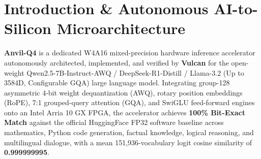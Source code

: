 \documentclass[11pt,a4paper]{article}
\begin{document}
\section{Introduction \& Autonomous AI-to-Silicon Microarchitecture}

\textbf{Anvil-Q4} is a dedicated W4A16 mixed-precision hardware inference accelerator autonomously architected, implemented, and verified by \textbf{Vulcan} for the open-weight Qwen2.5-7B-Instruct-AWQ /\allowbreak{} DeepSeek-R1-Distill /\allowbreak{} Llama-3.2 (\allowbreak{}Up to 3584D,\allowbreak{} Configurable GQA)\allowbreak{} large language model. Integrating group-128 asymmetric 4-bit weight dequantization (AWQ), rotary position embeddings (RoPE), 7:1 grouped-query attention (GQA), and SwiGLU feed-forward engines onto an Intel Arria 10 GX FPGA, the accelerator achieves \textbf{100\% Bit-Exact Match} against the official HuggingFace FP32 software baseline across mathematics, Python code generation, factual knowledge, logical reasoning, and multilingual dialogue, with a mean 151,936-vocabulary logit cosine similarity of \textbf{0.999999995}.

\vspace{2pt}
\end{document}
